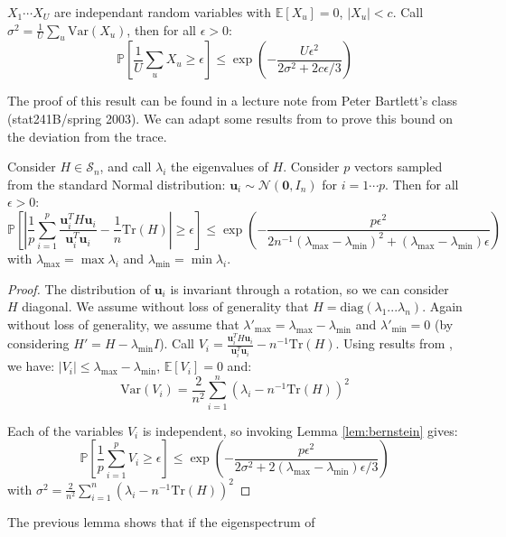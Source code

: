 \begin{lemma} \label{lem:bernstein}$X_{1}\cdots X_{U}$ are independant
random variables with $\mathbb{E}\left[X_{u}\right]=0$, $\left|X_{u}\right|<c$.
Call $\sigma^{2}=\frac{1}{U}\sum_{u}\text{Var}\left(X_{u}\right)$,
then for all $\epsilon>0$: 
\[
\mathbb{P}\left[\frac{1}{U}\sum_{u}X_{u}\geq\epsilon\right]\leq\exp\left(-\frac{U\epsilon^{2}}{2\sigma^{2}+2c\epsilon/3}\right)
\]


\end{lemma} The proof of this result can be found in a lecture note
from Peter Bartlett's class (stat241B/spring 2003). We can adapt some
results from \cite{Barry1999} to prove this bound on the deviation
from the trace. \begin{lemma} \label{lem:bernstein-trace}Consider
$H\in\mathcal{S}_{n}$, and call $\lambda_{i}$ the eigenvalues of
$H$. Consider $p$ vectors sampled from the standard Normal distribution:
$\mathbf{u}_{i}\sim\mathcal{N}\left(\mathbf{0},I_{n}\right)$ for
$i=1\cdots p$. Then for all $\epsilon>0$: 
\[
\mathbb{P}\left[\left|\frac{1}{p}\sum_{i=1}^{p}\frac{\mathbf{u}_{i}^{T}H\mathbf{u}_{i}}{\mathbf{u}_{i}^{T}\mathbf{u}_{i}}-\frac{1}{n}\mbox{Tr}\left(H\right)\right|\geq\epsilon\right]\leq\exp\left(-\frac{p\epsilon^{2}}{2n^{-1}\left(\lambda_{\max}-\lambda_{\min}\right)^{2}+\left(\lambda_{\max}-\lambda_{\min}\right)\epsilon}\right)
\]
with $\lambda_{\text{max}}=\max\lambda_{i}$ and $\lambda_{\min}=\min\lambda_{i}$.\end{lemma}
\begin{proof} The distribution of $\mathbf{u}_{i}$ is invariant
through a rotation, so we can consider $H$ diagonal. We assume without
loss of generality that $H=\text{diag}\left(\lambda_{1}...\lambda_{n}\right)$.
Again without loss of generality, we assume that $\lambda'_{\max}=\lambda_{\max}-\lambda_{\min}$
and $\lambda'_{\min}=0$ (by considering $H'=H-\lambda_{\min}I$).
Call $V_{i}=\frac{\mathbf{u}_{i}^{T}H\mathbf{u}_{i}}{\mathbf{u}_{i}^{T}\mathbf{u}_{i}}-n^{-1}\text{Tr}\left(H\right)$.
Using results from \cite{Barry1999}, we have: $\left|V_{i}\right|\leq\lambda_{\max}-\lambda_{\min}$,
$\mathbb{E}\left[V_{i}\right]=0$ and: 
\[
\text{Var}\left(V_{i}\right)=\frac{2}{n^{2}}\sum_{i=1}^{n}\left(\lambda_{i}-n^{-1}\text{Tr}\left(H\right)\right)^{2}
\]


Each of the variables $V_{i}$ is independent, so invoking Lemma \ref{lem:bernstein}
gives: 
\[
\mathbb{P}\left[\frac{1}{p}\sum_{i=1}^{p}V_{i}\geq\epsilon\right]\leq\exp\left(-\frac{p\epsilon^{2}}{2\sigma^{2}+2\left(\lambda_{\max}-\lambda_{\min}\right)\epsilon/3}\right)
\]
with $\sigma^{2}=\frac{2}{n^{2}}\sum_{i=1}^{n}\left(\lambda_{i}-n^{-1}\text{Tr}\left(H\right)\right)^{2}$
\end{proof} The previous lemma shows that if the eigenspectrum of
